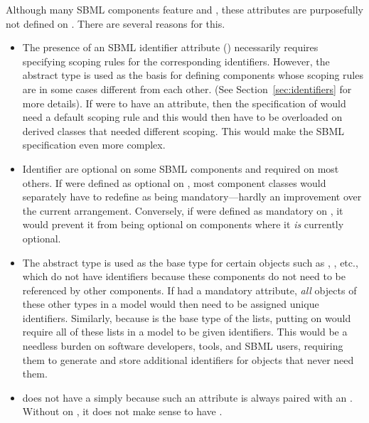 
Although many SBML components feature
 and , these attributes are purposefully not defined on
\SBase.  There are several reasons for this.
\begin{itemize}
  
\item The presence of an SBML identifier attribute ()
  necessarily requires specifying scoping rules for the
  corresponding identifiers.  However, the \SBase abstract type is
  used as the basis for defining components whose scoping rules
  are in some cases different from each other.  (See
  Section~\ref{sec:identifiers} for more details).  If \SBase were
  to have an  attribute, then the specification of \SBase
  would need a default scoping rule and this would then have to be
  overloaded on derived classes that needed different scoping.
  This would make the SBML specification even more complex.
  
\item Identifier are optional on some SBML components and required
  on most others.  If  were defined as optional on
  \SBase, most component classes would separately have to redefine
   as being mandatory---hardly an improvement over the
  current arrangement.  Conversely, if  were defined as
  mandatory on \SBase, it would prevent it from being optional on
  components where it \emph{is} currently optional.
  
\item The \SBase abstract type is used as the base type for
  certain objects such as \Sbml, \AssignmentRule,
  etc., which do not have identifiers because these components do
  not need to be referenced by other components.  If \SBase had a
  mandatory  attribute, \emph{all} objects of
  these other types in a model would then need to be assigned
  unique identifiers.  Similarly, because \SBase is the
    base type of the  lists,
  putting  on \SBase would require all of these lists in
  a model to be given identifiers.  This would be a needless
  burden on software developers, tools, and SBML users, requiring
  them to generate and store additional identifiers for objects
  that never need them.
  
\item \SBase does not have a  simply because such an
  attribute is always paired with an .  Without
   on \SBase, it does not make sense to have
  .

\end{itemize}


